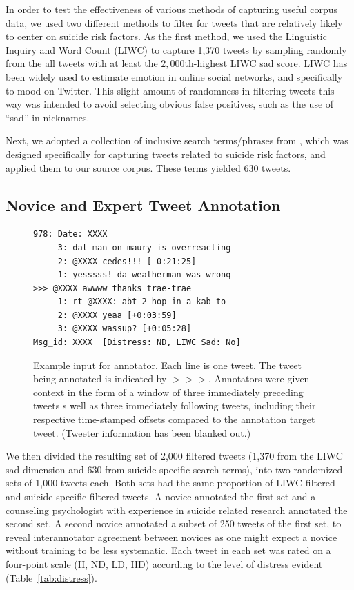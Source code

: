 \documentclass[11pt]{article}
\begin{document}
In order to test the effectiveness of various methods of capturing useful corpus data, we used two different methods to filter for tweets that are relatively likely to center on suicide risk factors. As the first method, we used the Linguistic Inquiry and Word Count (LIWC) to capture 1,370 tweets by sampling randomly from the all tweets with at least the $2,000$th-highest LIWC sad score. LIWC has been widely used to estimate emotion in online social networks, and specifically to  mood on Twitter. This slight amount of randomness in filtering tweets this way was intended to avoid selecting obvious false positives, such as the use of ``sad'' in nicknames.

Next, we adopted a collection of inclusive search terms/phrases from \cite{Jay}, which was designed specifically for capturing tweets related to suicide risk factors, and applied them to our source corpus. These terms yielded 630 tweets.


\subsection{Novice and Expert Tweet Annotation}
\begin{figure}[h]
  \centering
{\small
\begin{verbatim}
978: Date: XXXX 
    -3: dat man on maury is overreacting
    -2: @XXXX cedes!!! [-0:21:25]
    -1: yesssss! da weatherman was wronq
>>> @XXXX awwww thanks trae-trae
     1: rt @XXXX: abt 2 hop in a kab to 
     2: @XXXX yeaa [+0:03:59]
     3: @XXXX wassup? [+0:05:28]
Msg_id: XXXX  [Distress: ND, LIWC Sad: No]
\end{verbatim}}
  \caption{Example input for annotator. Each line is one tweet. The tweet being annotated is indicated by $>>>$. Annotators were given context in the form of a window of three immediately preceding tweets s well as three immediately following tweets, including their respective time-stamped offsets compared to the annotation target tweet. 
(Tweeter information has been blanked out.)}
  \label{fig:annotateeg}
\end{figure}

We then divided the resulting set of 2,000 filtered tweets (1,370 from the LIWC sad dimension and 630 from suicide-specific search terms), into two randomized sets of 1,000 tweets each. Both sets had the same proportion of LIWC-filtered and suicide-specific-filtered tweets. A novice annotated the first set and a counseling psychologist with experience in suicide related research annotated the second set. A second novice annotated a subset of 250 tweets of the first set, to reveal interannotator agreement between novices as one might expect a novice without training to be less systematic. Each tweet in each set was rated on a four-point scale (H, ND, LD, HD) according to the level of distress evident (Table~\ref{tab:distress}).
\end{document}
